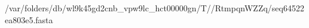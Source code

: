 \documentclass[10pt]{article}
\begin{document}
\begin{texshade}{/var/folders/db/wl9k45gd2cnb_vpw9lc_hct00000gn/T//RtmpqnWZZq/seq64522ea803e5.fasta}
\hideconsensus
{}
\hidelogoscale
{}
\showlegend
\end{texshade}
\end{document}
